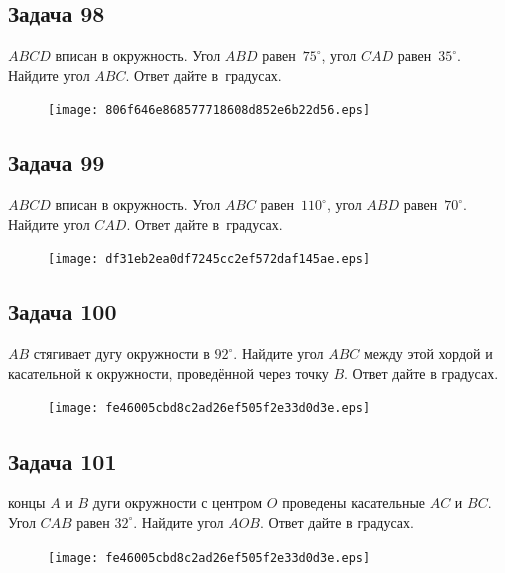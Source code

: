 \documentclass[a4paper,10pt]{article} %
\begin{document}
\begin{spacing}{1.0}
{\subsection*{Задача 98}
 $ABCD$ вписан в окружность. Угол $ABD$ равен~$75^\circ$, угол $CAD$ равен~$35^\circ$. Найдите угол $ABC$. Ответ дайте в~градусах.

\vspace{1.5cm}

\begin{figure}{\texttt{[image: 806f646e868577718608d852e6b22d56.eps]}}\end{figure}
\subsection*{Задача 99}
 $ABCD$ вписан в окружность. Угол $ABC$ равен~$110^\circ$, угол $ABD$ равен~$70^\circ$. Найдите угол $CAD$. Ответ дайте в~градусах.


\vspace{1.5cm}

\begin{figure}{\texttt{[image: df31eb2ea0df7245cc2ef572daf145ae.eps]}}\end{figure}
\subsection*{Задача 100}
 $AB$ стягивает дугу окружности в $92^\circ$. Найдите угол $ABC$ между этой хордой и касательной к окружности, проведённой через точку $B$. Ответ дайте в градусах.

\vspace{1.5cm}

\begin{figure}{\texttt{[image: fe46005cbd8c2ad26ef505f2e33d0d3e.eps]}}\end{figure}
\subsection*{Задача 101}
 концы $A$ и $B$ дуги окружности с центром $O$ проведены касательные $AC$ и $BC$. Угол $CAB$ равен $32^\circ$. Найдите угол $AOB$. Ответ дайте в градусах.

\vspace{1.5cm}

\begin{figure}{\texttt{[image: fe46005cbd8c2ad26ef505f2e33d0d3e.eps]}}\end{figure}
}
\end{spacing}
\end{document}
